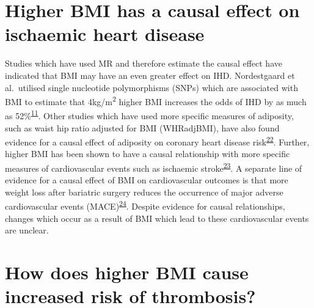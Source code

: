 \documentclass[11pt,twoside]{bristolthesis}
\begin{document}
\hypertarget{higher-bmi-has-a-causal-effect-on-ischaemic-heart-disease}{%
\section{Higher BMI has a causal effect on ischaemic heart disease}\label{higher-bmi-has-a-causal-effect-on-ischaemic-heart-disease}}

Studies which have used MR and therefore estimate the causal effect have indicated that BMI may have an even greater effect on IHD. Nordestgaard et al.~utilised single nucleotide polymorphisms (SNPs) which are associated with BMI to estimate that 4kg/m\textsuperscript{2} higher BMI increases the odds of IHD by as much as 52\%\textsuperscript{\protect\hyperlink{ref-Nordestgaard2012}{11}}. Other studies which have used more specific measures of adiposity, such as waist hip ratio adjusted for BMI (WHRadjBMI), have also found evidence for a causal effect of adiposity on coronary heart disease risk\textsuperscript{\protect\hyperlink{ref-Dale2017}{22}}. Further, higher BMI has been shown to have a causal relationship with more specific measures of cardiovascular events such as ischaemic stroke\textsuperscript{\protect\hyperlink{ref-Harshfield2021}{23}}. A separate line of evidence for a causal effect of BMI on cardiovascular outcomes is that more weight loss after bariatric surgery reduces the occurrence of major adverse cardiovascular events (MACE)\textsuperscript{\protect\hyperlink{ref-Jimenez2021}{24}}. Despite evidence for causal relationships, changes which occur as a result of BMI which lead to these cardiovascular events are unclear.

\hypertarget{how-does-higher-bmi-cause-increased-risk-of-thrombosis}{%
\section{How does higher BMI cause increased risk of thrombosis?}\label{how-does-higher-bmi-cause-increased-risk-of-thrombosis}}
\end{document}
